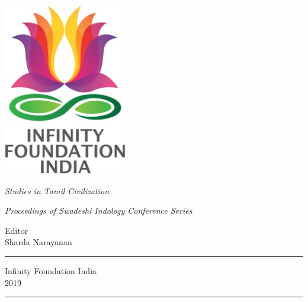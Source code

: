 \thispagestyle{empty}
\begin{center}
\includegraphics[scale=0.3]{images/logo.png}
\bigskip

{\fontsize{10}{14}\selectfont\sl
Studies in Tamil Civilization
}

\bigskip
\end{center}
\medskip

\begin{center}
{\fontsize{20}{24}\selectfont {F\,O\,U\,N\,T\; o\,f\; C\,U\,L\,T\,U\,R\,E}}
\bigskip

{\sl\small Proceedings of Swadeshi Indology Conference Series}
\vfill


{\fontsize{14}{18}\selectfont 
Editor\\[2pt]
Sharda Narayanan\par
}
\vfill

\rule{5cm}{1pt}

{\fontsize{12}{14}\selectfont
Infinity Foundation India\\[4pt]
2019}

\rule{5cm}{1pt}
\end{center}




